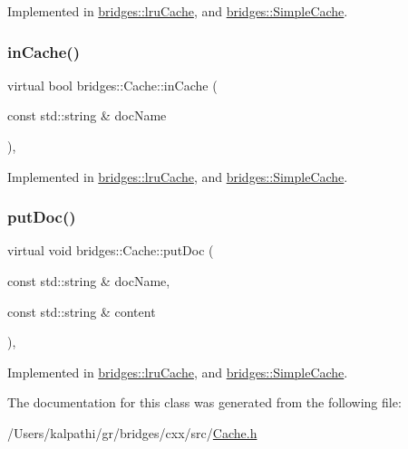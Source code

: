 Implemented in \mbox{\hyperlink{classbridges_1_1lru_cache_ac8bed8ab7cbf002a23573c071ba04ad6}{bridges\+::lru\+Cache}}, and \mbox{\hyperlink{classbridges_1_1_simple_cache_a905ad2e7fb1b6784a5f70caf024b157f}{bridges\+::\+Simple\+Cache}}.

\mbox{\label{classbridges_1_1_cache_abf3601225841d14dcd5611cd6a223ba4}} 
\subsubsection{\texorpdfstring{inCache()}{inCache()}}
{\footnotesize\ttfamily virtual bool bridges\+::\+Cache\+::in\+Cache (\begin{DoxyParamCaption}\item[{const std\+::string \&}]{doc\+Name }\end{DoxyParamCaption})\hspace{0.3cm}{\ttfamily [pure virtual]}, {\ttfamily [noexcept]}}



Implemented in \mbox{\hyperlink{classbridges_1_1lru_cache_ab56c75166ddcc3d17e6924e581f7a4e8}{bridges\+::lru\+Cache}}, and \mbox{\hyperlink{classbridges_1_1_simple_cache_a9af328045bad7c3bd4ed6cf99352bf07}{bridges\+::\+Simple\+Cache}}.

\mbox{\label{classbridges_1_1_cache_ae74225542568a377fdcaf0354e466954}} 
\subsubsection{\texorpdfstring{putDoc()}{putDoc()}}
{\footnotesize\ttfamily virtual void bridges\+::\+Cache\+::put\+Doc (\begin{DoxyParamCaption}\item[{const std\+::string \&}]{doc\+Name,  }\item[{const std\+::string \&}]{content }\end{DoxyParamCaption})\hspace{0.3cm}{\ttfamily [pure virtual]}, {\ttfamily [noexcept]}}



Implemented in \mbox{\hyperlink{classbridges_1_1lru_cache_a927fa1186ba830717ce11898c2beb4c7}{bridges\+::lru\+Cache}}, and \mbox{\hyperlink{classbridges_1_1_simple_cache_a61264b1080a4458d6210c7cf6b4e8615}{bridges\+::\+Simple\+Cache}}.



The documentation for this class was generated from the following file\+:\begin{DoxyCompactItemize}
\item 
/\+Users/kalpathi/gr/bridges/cxx/src/\mbox{\hyperlink{_cache_8h}{Cache.\+h}}\end{DoxyCompactItemize}
